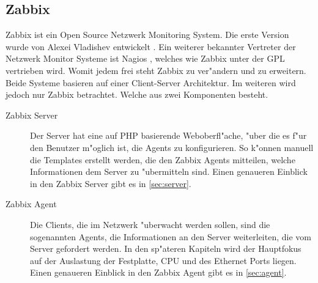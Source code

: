 \subsection{Zabbix}
Zabbix ist ein Open Source Netzwerk Monitoring System. Die erste Version wurde von \mbox{Alexei} Vladishev entwickelt \autocite{zabbix:Web}. %
Ein weiterer bekannter Vertreter der Netzwerk Monitor Systeme ist Nagios \autocite{wiki:Nagios}, welches wie Zabbix unter der GPL vertrieben %
wird. Womit jedem frei steht Zabbix zu ver"andern und zu erweitern.  %
Beide Systeme basieren auf einer Client-Server Architektur. Im weiteren wird jedoch nur Zabbix betrachtet. %
Welche aus zwei Komponenten besteht. %

\begin{description}
\item[Zabbix Server]Der Server hat eine auf PHP basierende Weboberfl"ache, "uber die es f"ur den Benutzer m"oglich ist, die Agents zu %
konfigurieren. So k"onnen manuell die Templates erstellt werden, die den Zabbix Agents mitteilen, welche Informationen dem %
Server zu "ubermitteln sind. Einen genaueren Einblick in den Zabbix Server gibt es in \cref{sec:server}. %
\item[Zabbix Agent]Die Clients, die im Netzwerk "uberwacht werden sollen, sind die sogenannten Agents, die  %
Informationen an den Server weiterleiten, die vom Server gefordert werden. In den sp"ateren Kapiteln wird der Hauptfokus auf der %
Auslastung der Festplatte, CPU und des Ethernet Ports liegen. %
Einen genaueren Einblick in den Zabbix Agent gibt es in \cref{sec:agent}. %
\end{description} 


